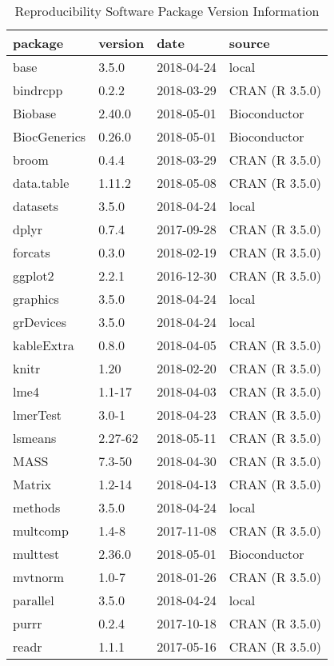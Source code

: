 \documentclass[]{article}
\begin{document}
\begin{table}[!h]

\caption{\label{tab:supp2} Reproducibility Software Package Version Information}
\centering
\fontsize{7}{9}\selectfont
\begin{tabular}[t]{llll}
\toprule
package & version & date & source\\
\midrule
base & 3.5.0 & 2018-04-24 & local\\
bindrcpp & 0.2.2 & 2018-03-29 & CRAN (R 3.5.0)\\
Biobase & 2.40.0 & 2018-05-01 & Bioconductor\\
BiocGenerics & 0.26.0 & 2018-05-01 & Bioconductor\\
broom & 0.4.4 & 2018-03-29 & CRAN (R 3.5.0)\\
data.table & 1.11.2 & 2018-05-08 & CRAN (R 3.5.0)\\
datasets & 3.5.0 & 2018-04-24 & local\\
dplyr & 0.7.4 & 2017-09-28 & CRAN (R 3.5.0)\\
forcats & 0.3.0 & 2018-02-19 & CRAN (R 3.5.0)\\
ggplot2 & 2.2.1 & 2016-12-30 & CRAN (R 3.5.0)\\
graphics & 3.5.0 & 2018-04-24 & local\\
grDevices & 3.5.0 & 2018-04-24 & local\\
kableExtra & 0.8.0 & 2018-04-05 & CRAN (R 3.5.0)\\
knitr & 1.20 & 2018-02-20 & CRAN (R 3.5.0)\\
lme4 & 1.1-17 & 2018-04-03 & CRAN (R 3.5.0)\\
lmerTest & 3.0-1 & 2018-04-23 & CRAN (R 3.5.0)\\
lsmeans & 2.27-62 & 2018-05-11 & CRAN (R 3.5.0)\\
MASS & 7.3-50 & 2018-04-30 & CRAN (R 3.5.0)\\
Matrix & 1.2-14 & 2018-04-13 & CRAN (R 3.5.0)\\
methods & 3.5.0 & 2018-04-24 & local\\
multcomp & 1.4-8 & 2017-11-08 & CRAN (R 3.5.0)\\
multtest & 2.36.0 & 2018-05-01 & Bioconductor\\
mvtnorm & 1.0-7 & 2018-01-26 & CRAN (R 3.5.0)\\
parallel & 3.5.0 & 2018-04-24 & local\\
purrr & 0.2.4 & 2017-10-18 & CRAN (R 3.5.0)\\
readr & 1.1.1 & 2017-05-16 & CRAN (R 3.5.0)\\

\end{tabular}
\end{table}
\end{document}
